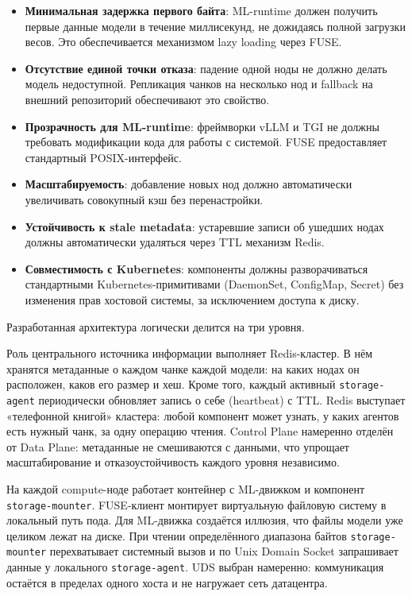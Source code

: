 \begin{itemize}[leftmargin=*]
  \item \textbf{Минимальная задержка первого байта}: ML-runtime должен получить первые данные модели в течение миллисекунд, не дожидаясь полной загрузки весов. Это обеспечивается механизмом lazy loading через FUSE.
  \item \textbf{Отсутствие единой точки отказа}: падение одной ноды не должно делать модель недоступной. Репликация чанков на несколько нод и fallback на внешний репозиторий обеспечивают это свойство.
  \item \textbf{Прозрачность для ML-runtime}: фреймворки vLLM и TGI не должны требовать модификации кода для работы с системой. FUSE предоставляет стандартный POSIX-интерфейс.
  \item \textbf{Масштабируемость}: добавление новых нод должно автоматически увеличивать совокупный кэш без перенастройки.
  \item \textbf{Устойчивость к stale metadata}: устаревшие записи об ушедших нодах должны автоматически удаляться через TTL механизм Redis.
  \item \textbf{Совместимость с Kubernetes}: компоненты должны разворачиваться стандартными Kubernetes-примитивами (DaemonSet, ConfigMap, Secret) без изменения прав хостовой системы, за исключением доступа к диску.
\end{itemize}

Разработанная архитектура логически делится на три уровня.

 Роль центрального источника информации выполняет Redis-кластер. В нём хранятся метаданные о каждом чанке каждой модели: на каких нодах он расположен, каков его размер и хеш. Кроме того, каждый активный \texttt{storage-agent} периодически обновляет запись о себе (heartbeat) с TTL. Redis выступает «телефонной книгой» кластера: любой компонент может узнать, у каких агентов есть нужный чанк, за одну операцию чтения. Control Plane намеренно отделён от Data Plane: метаданные не смешиваются с данными, что упрощает масштабирование и отказоустойчивость каждого уровня независимо.

 На каждой compute-ноде работает контейнер с ML-движком и компонент \texttt{storage-mounter}. FUSE-клиент монтирует виртуальную файловую систему в локальный путь пода. Для ML-движка создаётся иллюзия, что файлы модели уже целиком лежат на диске. При чтении определённого диапазона байтов \texttt{storage-mounter} перехватывает системный вызов и по Unix Domain Socket запрашивает данные у локального \texttt{storage-agent}. UDS выбран намеренно: коммуникация остаётся в пределах одного хоста и не нагружает сеть датацентра.

